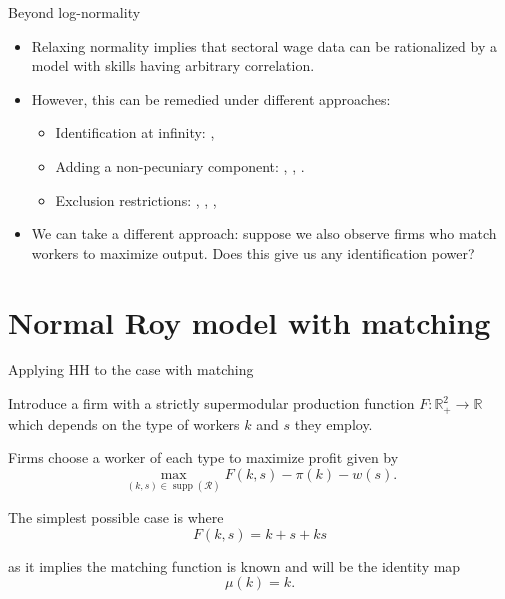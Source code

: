 \documentclass[aspectratio=169]{beamer}
\DeclareMathOperator\supp{supp}
\begin{document}
\begin{frame}{Beyond log-normality}
	\begin{itemize}
		\item Relaxing normality implies that sectoral wage data can be rationalized by a model with skills having arbitrary correlation. \citep{heckman1990empirical}
		\bigskip
		\item However, this can be remedied under different approaches:
		\begin{itemize}
			\smallskip
			\item Identification at infinity: \citet{heckman1990empirical} \citet{french2011identification}, \citet{d2013another}
			\smallskip
			\item Adding a non-pecuniary component: \citet{heckman2007econometric} \citet{d2013inference}, \citet{bayer2011nonparametric}, \citet{lee2023nonparametric}.
			\smallskip
			\item Exclusion restrictions: \citet{heckman1990empirical}, \citet{buera2006non}, \citet{french2011identification}, \citet{mourifie2020sharp}
		\end{itemize}
		\bigskip
		\item We can take a different approach: suppose we also observe firms who match workers to maximize output. Does this give us any identification power?
	\end{itemize}
\end{frame}

\section{Normal Roy model with matching}

\begin{frame}{Applying HH to the case with matching}

Introduce a firm with a strictly supermodular production function $F:\mathbb{R}^2_+ \to \mathbb{R}$ which depends on the type of workers $k$ and $s$ they employ.

\vspace{0.3cm}

	Firms choose a worker of each type to maximize profit given by
\begin{equation*}
	\max_{(k,s)\in\supp(\mathcal{R})} F(k,s) - \pi(k) - w(s).
\end{equation*}

The simplest possible case is where
\begin{equation*}
	F(k,s) = k + s + ks
\end{equation*}

as it implies the matching function is known and will be the identity map
\begin{equation*}
	\mu(k) = k.
\end{equation*}

\end{frame}
\end{document}
